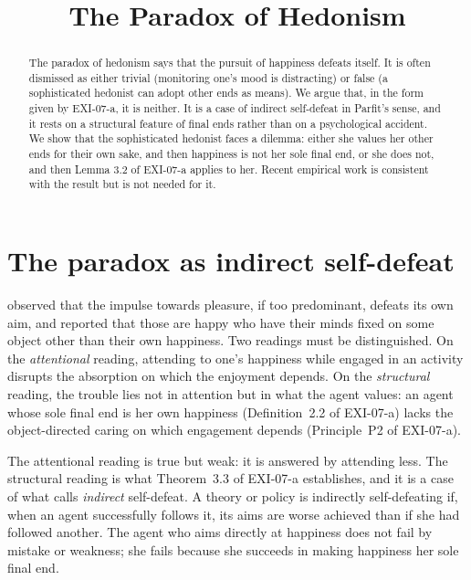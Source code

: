 \documentclass{situationist-preprint}
\title{The Paradox of Hedonism}
\begin{document}
\maketitle

\begin{abstract}
The paradox of hedonism says that the pursuit of happiness defeats itself. It is often dismissed as either trivial (monitoring one's mood is distracting) or false (a sophisticated hedonist can adopt other ends as means). We argue that, in the form given by EXI-07-a, it is neither. It is a case of indirect self-defeat in Parfit's sense, and it rests on a structural feature of final ends rather than on a psychological accident. We show that the sophisticated hedonist faces a dilemma: either she values her other ends for their own sake, and then happiness is not her sole final end, or she does not, and then Lemma 3.2 of EXI-07-a applies to her. Recent empirical work is consistent with the result but is not needed for it.
\end{abstract}

\section{The paradox as indirect self-defeat}

\citet[II.iii]{Sidgwick1907} observed that the impulse towards pleasure, if too predominant, defeats its own aim, and \citet[ch.~V]{Mill1873} reported that those are happy who have their minds fixed on some object other than their own happiness. Two readings must be distinguished. On the \emph{attentional} reading, attending to one's happiness while engaged in an activity disrupts the absorption on which the enjoyment depends. On the \emph{structural} reading, the trouble lies not in attention but in what the agent values: an agent whose sole final end is her own happiness (Definition~2.2 of EXI-07-a) lacks the object-directed caring on which engagement depends (Principle~P2 of EXI-07-a).

The attentional reading is true but weak: it is answered by attending less. The structural reading is what Theorem~3.3 of EXI-07-a establishes, and it is a case of what \citet[\S1]{Parfit1984} calls \emph{indirect} self-defeat. A theory or policy is indirectly self-defeating if, when an agent successfully follows it, its aims are worse achieved than if she had followed another. The agent who aims directly at happiness does not fail by mistake or weakness; she fails because she succeeds in making happiness her sole final end.
\end{document}
